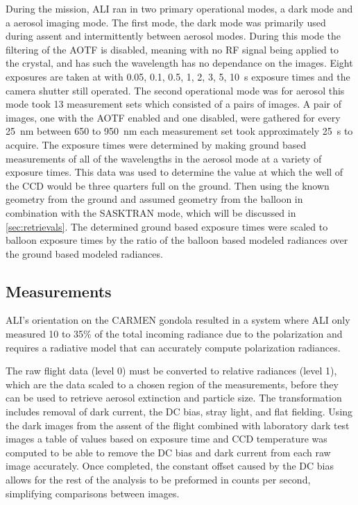 \documentclass[12pt]{article}
\begin{document}
During the mission, ALI ran in two primary operational modes, a dark mode and a aerosol imaging mode. The first mode, the dark mode was primarily used during assent and intermittently between aerosol modes. During this mode the filtering of the AOTF is disabled, meaning with no RF signal being applied to the crystal, and has such the wavelength has no dependance on the images. Eight exposures are taken at with 0.05, 0.1, 0.5, 1, 2, 3, 5, 10~s exposure times and the camera shutter still operated. The second operational mode was for aerosol this mode took 13 measurement sets which consisted of a pairs of images. A pair of images, one with the AOTF enabled and one disabled, were gathered for every 25~nm between 650 to 950~nm each measurement set took approximately 25~s to acquire. The exposure times were determined by making ground based measurements of all of the wavelengths in the aerosol mode at a variety of exposure times. This data was used to determine the value at which the well of the CCD would be three quarters full on the ground. Then using the known geometry from the ground and assumed geometry from the balloon in combination with the SASKTRAN mode, which will be discussed in \autoref{sec:retrievals}. The determined ground based exposure times were scaled to balloon exposure times by the ratio of the balloon based modeled radiances over the ground based modeled radiances. %

\subsection{Measurements}

ALI's orientation on the CARMEN gondola resulted in a system where ALI only measured 10 to 35\% of the total incoming radiance due to the polarization and requires a radiative model that can accurately compute polarization radiances.

The raw flight data (level 0) must be converted to relative radiances (level 1), which are the data scaled to a chosen region of the measurements, before they can be used to retrieve aerosol extinction and particle size. The transformation includes removal of dark current, the DC bias, stray light, and flat fielding. Using the dark images from the assent of the flight combined with laboratory dark test images a table of values based on exposure time and CCD temperature was computed to be able to remove the DC bias and dark current from each raw image accurately. Once completed, the constant offset caused by the DC bias allows for the rest of the analysis to be preformed in counts per second, simplifying comparisons between images. %
\end{document}
